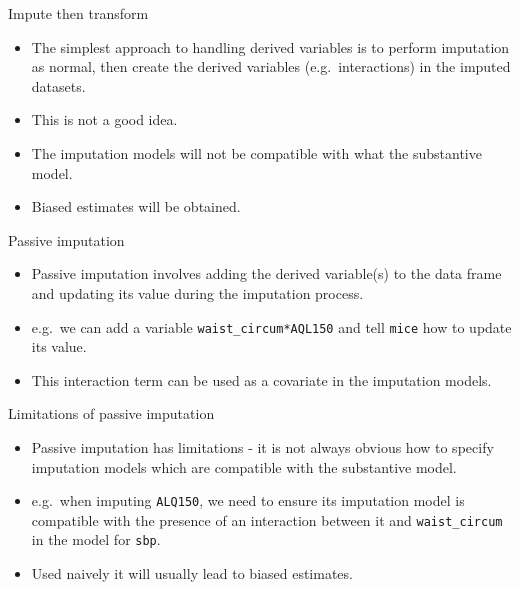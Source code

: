 \documentclass[ignorenonframetext,]{beamer}
\providecommand{\tightlist}{%
  \setlength{\itemsep}{0pt}\setlength{\parskip}{0pt}}
\begin{document}
\begin{frame}{Impute then transform}
\protect\hypertarget{impute-then-transform}{}

\begin{itemize}
\tightlist
\item
  The simplest approach to handling derived variables is to perform
  imputation as normal, then create the derived variables
  (e.g.~interactions) in the imputed datasets.
\item
  This is not a good idea.
\item
  The imputation models will not be compatible with what the substantive
  model.
\item
  Biased estimates will be obtained.
\end{itemize}

\end{frame}

\begin{frame}[fragile]{Passive imputation}
\protect\hypertarget{passive-imputation}{}

\begin{itemize}
\tightlist
\item
  Passive imputation involves adding the derived variable(s) to the data
  frame and updating its value during the imputation process.
\item
  e.g.~we can add a variable \texttt{waist\_circum*AQL150} and tell
  \texttt{mice} how to update its value.
\item
  This interaction term can be used as a covariate in the imputation
  models.
\end{itemize}

\end{frame}

\begin{frame}[fragile]{Limitations of passive imputation}
\protect\hypertarget{limitations-of-passive-imputation}{}

\begin{itemize}
\tightlist
\item
  Passive imputation has limitations - it is not always obvious how to
  specify imputation models which are compatible with the substantive
  model.
\item
  e.g.~when imputing \texttt{ALQ150}, we need to ensure its imputation
  model is compatible with the presence of an interaction between it and
  \texttt{waist\_circum} in the model for \texttt{sbp}.
\item
  Used naively it will usually lead to biased estimates.
\end{itemize}

\end{frame}
\end{document}
